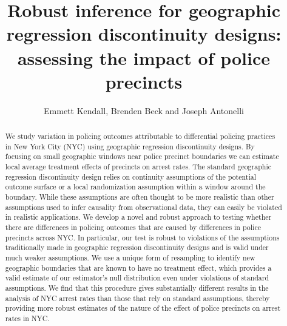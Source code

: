 \documentclass[a4paper,11pt]{article}
\title{Robust inference for geographic regression discontinuity designs: assessing the impact of police precincts}
\author{Emmett Kendall, Brenden Beck and Joseph Antonelli}
\date{}
\begin{document}
\maketitle

\begin{abstract}
We study variation in policing outcomes attributable to differential policing practices in New York City (NYC) using geographic regression discontinuity designs. By focusing on small geographic windows near police precinct boundaries we can estimate local average treatment effects of  precincts on arrest rates. The standard geographic regression discontinuity design relies on continuity assumptions of the potential outcome surface or a local randomization assumption within a window around the boundary. While these assumptions are often thought to be more realistic than other assumptions used to infer causality from observational data, they can easily be violated in realistic applications. We develop a novel and robust approach to testing whether there are differences in policing outcomes that are caused by differences in police precincts across NYC. In particular, our test is robust to violations of the assumptions traditionally made in geographic regression discontinuity designs and is valid under much weaker assumptions. We use a unique form of resampling to identify new geographic boundaries that are known to have no treatment effect, which provides a valid estimate of our estimator's null distribution even under violations of standard assumptions. We find that this procedure gives substantially different results in the analysis of NYC arrest rates than those that rely on standard assumptions, thereby providing more robust estimates of the nature of the effect of police precincts on arrest rates in NYC.  


\end{abstract}
\end{document}
